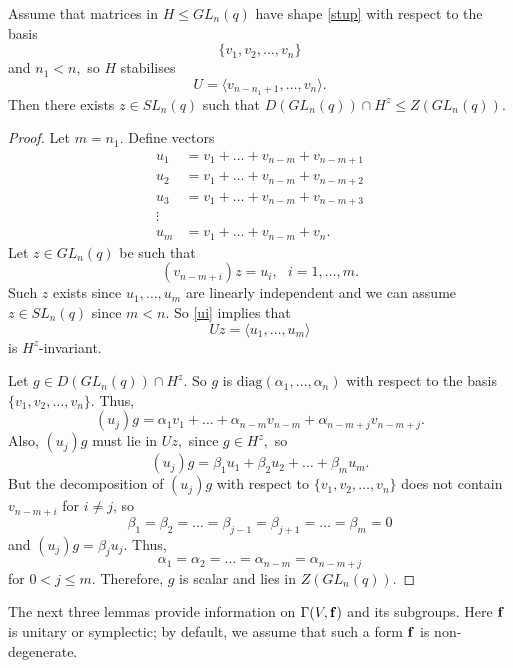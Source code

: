 \begin{Lem}\label{diag}
Assume that matrices in $H\le GL_n(q)$ have shape \eqref{stup} with respect to the  basis $$\{v_1, v_2, \ldots,  v_n \}$$ and $n_1 < n,$ so $H$ stabilises $$U=\langle v_{n-n_1+1}, \ldots, v_n \rangle.$$  Then there exists $z \in SL_n(q)$ such that $D(GL_n(q)) \cap H^z \le Z(GL_n(q)).$
\end{Lem} 
\begin{proof}
Let $m=n_1.$ Define vectors 
\begin{equation*}
\begin{split}
u_1 & = v_1 + \ldots + v_{n-m} + v_{n-m+1}  \\
u_2 & = v_1 + \ldots + v_{n-m} + v_{n-m +2}\\
u_3 & = v_1 + \ldots + v_{n-m}  + v_{n-m +3}\\
\vdots \\
u_m & = v_1 + \ldots + v_{n-m} + v_{n}.
\end{split}
\end{equation*}
Let $z \in GL_n(q)$ be such that 
\begin{equation}\label{ui}
(v_{n-m+i})z=u_i, \text{ } i=1, \ldots, m.
\end{equation}
 Such  $z$ exists since $u_1, \ldots, u_m$ are linearly independent and we can assume $z\in SL_n(q)$ since $m<n.$ So \eqref{ui} implies that 
$$Uz = \langle u_1, \ldots, u_m \rangle $$ is $H^z$-invariant.

Let $g \in D(GL_n(q)) \cap H^z.$ So $g$ is $\text{diag}(\alpha_1, \ldots , \alpha_n)$ with respect to the basis $\{v_1, v_2, \ldots, v_{n}\}$. Thus,
$$(u_j)g = \alpha_1 v_1 + \ldots + \alpha_{n-m} v_{n-m} + \alpha_{n-m+j} v_{n-m+j}. $$
Also, $(u_j)g$ must lie in $Uz,$ since $g \in H^z,$ so 
$$(u_j)g = \beta_1 u_1 + \beta_2 u_2 + \ldots + \beta_m u_m.$$
But the decomposition of $(u_j)g$ with respect to    $\{v_1, v_2, \ldots, v_{n}\}$ does not contain $v_{n-m +i}$ for $i \ne j$, so 
$$\beta_1 = \beta_2 = \ldots =\beta_{j-1} =\beta_{j+1}= \ldots = \beta_m =0$$ and $(u_j)g= \beta_j u_j$. Thus, 
$$\alpha_1 = \alpha_2 = \ldots =  \alpha_{n-m}=\alpha_{n-m+j}$$
for $0<j\le m.$
Therefore, $g$ is scalar and lies in $Z(GL_n(q)).$
\end{proof}

 The next three lemmas provide information on $\Gamma(V, {\bf f})$ and its subgroups. Here ${\bf f}$ is unitary or symplectic; by default, we  assume that such a form ${\bf f}$ is non-degenerate. 



